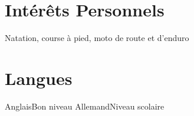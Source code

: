 \documentclass[letterpaper]{twentysecondcv} %
\begin{document}
\section{Intérêts Personnels}

\begin{twenty}
	\twentyitem
	{}{}{Natation, course à pied, moto de route et d'enduro }{}{}{}
\end{twenty}

\section{Langues}

\begin{twenty} %
	\twentyitem
    	{}{}{Anglais}{Bon niveau}{}{}
	\twentyitem
    	{}{}{Allemand}{Niveau scolaire}{}{}
\end{twenty}
\end{document}
